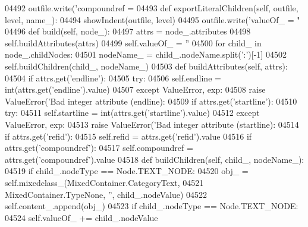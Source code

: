 \begin{DoxyCode}
{{{{{{{{{{{{{{{{{{{{{{{{{{{{{{{{{{{{{{{{{{{{{{{{{{{{{{{{{{{{{{{{{{{{{{{{{{{{{{{{{{{{{{{{{{{{{{{{{{{{{{{{{{{{{{{{{{{{{{{{{{{{{{{{{{{{{{{{{{{{{{{{{{{{{{{{{{{{{{{{{{{{{{{{{{{{{{{{{{{{{{{{{{{{{{{{{{{{{{{{{{{{{{{{{{{{{{{{{{{{{{{{{{{{{{{{{{{{{{{{{{{{{{{{{{{{{{{{{{{{{{{{{{{{{{{{{{{{{{{{{{{{{{{{{{{{{{{{{{04492             outfile.write(\textcolor{stringliteral}{'compoundref = %
04493     \textcolor{keyword}{def }exportLiteralChildren(self, outfile, level, name\_):
04494         showIndent(outfile, level)
04495         outfile.write(\textcolor{stringliteral}{'valueOf\_ = "%
04496     \textcolor{keyword}{def }build(self, node\_):
04497         attrs = node\_.attributes
04498         self.buildAttributes(attrs)
04499         self.valueOf_ = \textcolor{stringliteral}{''}
04500         \textcolor{keywordflow}{for} child\_ \textcolor{keywordflow}{in} node\_.childNodes:
04501             nodeName\_ = child\_.nodeName.split(\textcolor{stringliteral}{':'})[-1]
04502             self.buildChildren(child\_, nodeName\_)
04503     \textcolor{keyword}{def }buildAttributes(self, attrs):
04504         \textcolor{keywordflow}{if} attrs.get(\textcolor{stringliteral}{'endline'}):
04505             \textcolor{keywordflow}{try}:
04506                 self.endline = int(attrs.get(\textcolor{stringliteral}{'endline'}).value)
04507             \textcolor{keywordflow}{except} ValueError, exp:
04508                 \textcolor{keywordflow}{raise} ValueError(\textcolor{stringliteral}{'Bad integer attribute (endline): %
04509         \textcolor{keywordflow}{if} attrs.get(\textcolor{stringliteral}{'startline'}):
04510             \textcolor{keywordflow}{try}:
04511                 self.startline = int(attrs.get(\textcolor{stringliteral}{'startline'}).value)
04512             \textcolor{keywordflow}{except} ValueError, exp:
04513                 \textcolor{keywordflow}{raise} ValueError(\textcolor{stringliteral}{'Bad integer attribute (startline): %
04514         \textcolor{keywordflow}{if} attrs.get(\textcolor{stringliteral}{'refid'}):
04515             self.refid = attrs.get(\textcolor{stringliteral}{'refid'}).value
04516         \textcolor{keywordflow}{if} attrs.get(\textcolor{stringliteral}{'compoundref'}):
04517             self.compoundref = attrs.get(\textcolor{stringliteral}{'compoundref'}).value
04518     \textcolor{keyword}{def }buildChildren(self, child\_, nodeName\_):
04519         \textcolor{keywordflow}{if} child\_.nodeType == Node.TEXT\_NODE:
04520             obj\_ = self.mixedclass_(MixedContainer.CategoryText,
04521                 MixedContainer.TypeNone, \textcolor{stringliteral}{''}, child\_.nodeValue)
04522             self.content\_.append(obj\_)
04523         \textcolor{keywordflow}{if} child\_.nodeType == Node.TEXT\_NODE:
04524             self.valueOf_ += child\_.nodeValue
}}}}}}}}}}}}}}}}}}}}}}}}}}}}}}}}}}}}}}}}}}}}}}}}}}}}}}}}}}}}}}}}}}}}}}}}}}}}}}}}}}}}}}}}}}}}}}}}}}}}}}}}}}}}}}}}}}}}}}}}}}}}}}}}}}}}}}}}}}}}}}}}}}}}}}}}}}}}}}}}}}}}}}}}}}}}}}}}}}}}}}}}}}}}}}}}}}}}}}}}}}}}}}}}}}}}}}}}}}}}}}}}}}}}}}}}}}}}}}}}}}}}}}}}}}}}}}}}}}}}}}}}}}}}}}}}}}}}}}}}}}}}}}}}}}}}}}}}}}}}}}
\end{DoxyCode}
